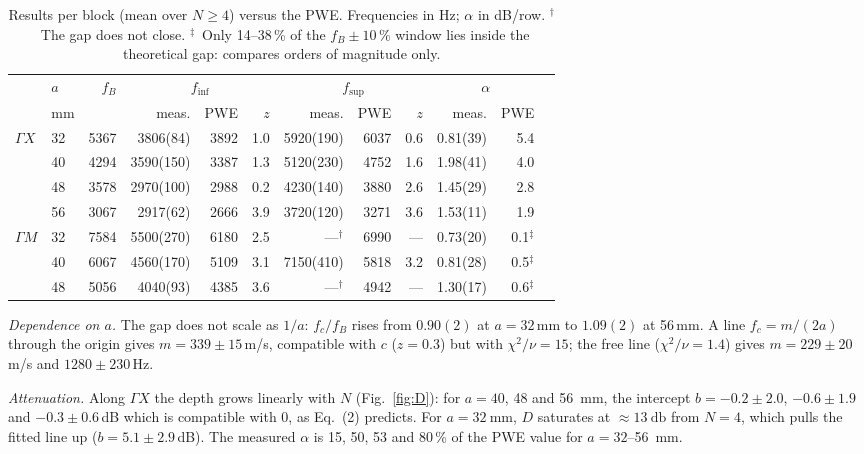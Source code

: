 \documentclass[9pt,a4paper,twocolumn]{extarticle}
\newcommand{\umm}{\milli\metre}
\newcommand{\udB}{\decibel}
\newcommand{\GX}{\ensuremath{\Gamma X}}
\newcommand{\GM}{\ensuremath{\Gamma M}}
\newcommand{\finf}{\ensuremath{f_{\mathrm{inf}}}}
\newcommand{\fsup}{\ensuremath{f_{\mathrm{sup}}}}
\begin{document}
\begin{table}[H]
\centering
\caption{Results per block (mean over $N\ge4$) versus the PWE. Frequencies in Hz; $\alpha$ in dB/row. $^\dagger$~The gap does not close. $^\ddagger$~Only 14--38\,\% of the $f_B\pm10\,\%$ window lies inside the theoretical gap: compares orders of magnitude only.}
\label{tab:main}
\scriptsize
\setlength{\tabcolsep}{2.6pt}
\begin{tabular}{@{}llrrrrrrrrrr@{}}
\toprule
 & $a$ & $f_B$ & \multicolumn{3}{c}{\finf} & \multicolumn{3}{c}{\fsup} & \multicolumn{2}{c}{$\alpha$}\\
 \cmidrule(lr){4-6}\cmidrule(lr){7-9}\cmidrule(l){10-11}
 & mm & & meas. & PWE & $z$ & meas. & PWE & $z$ & meas. & PWE\\
\midrule
\GX & 32 & 5367 & 3806(84)  & 3892 & 1.0 & 5920(190) & 6037 & 0.6 & 0.81(39) & 5.4\\
    & 40 & 4294 & 3590(150) & 3387 & 1.3 & 5120(230) & 4752 & 1.6 & 1.98(41) & 4.0\\
    & 48 & 3578 & 2970(100) & 2988 & 0.2 & 4230(140) & 3880 & 2.6 & 1.45(29) & 2.8\\
    & 56 & 3067 & 2917(62)  & 2666 & 3.9 & 3720(120) & 3271 & 3.6 & 1.53(11) & 1.9\\
\midrule
\GM & 32 & 7584 & 5500(270) & 6180 & 2.5 & ---$^\dagger$ & 6990 & --- & 0.73(20) & 0.1$^\ddagger$\\
    & 40 & 6067 & 4560(170) & 5109 & 3.1 & 7150(410) & 5818 & 3.2 & 0.81(28) & 0.5$^\ddagger$\\
    & 48 & 5056 & 4040(93)  & 4385 & 3.6 & ---$^\dagger$ & 4942 & --- & 1.30(17) & 0.6$^\ddagger$\\
\bottomrule
\end{tabular}
\end{table}

\emph{Dependence on $a$.} The gap does not scale as $1/a$: $f_c/f_B$ rises from $0.90(2)$ at
$a=32$\,mm to $1.09(2)$ at 56\,mm. A line $f_c=m/(2a)$ through the origin gives
$m=339\pm15$\,m/s, compatible with $c$ ($z=0.3$) but with
$\chi^2/\nu=15$; the free line ($\chi^2/\nu=1.4$) gives $m=229\pm20$\,m/s and $1280\pm230$\,Hz.

\emph{Attenuation.} Along \GX{} the depth grows linearly with $N$ (Fig.~\ref{fig:D}): for $a=40$, 48
and \SI{56}{\umm}, the intercept $b=-0.2\pm2.0$, $-0.6\pm1.9$ and
$-0.3\pm0.6$\,dB which is compatible with 0, as Eq.~(2) predicts. For $a=\SI{32}{\umm}$, $D$ saturates at $\approx\SI{13}{\udB}$ from $N=4$,
which pulls the fitted line up ($b=5.1\pm2.9$\,dB). The measured $\alpha$ is 15, 50, 53 and 80\,\% of the
PWE value for $a=32$--\SI{56}{\umm}.
\end{document}
